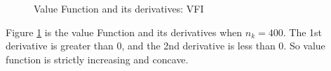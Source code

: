 \documentclass{article}
\begin{document}
	\begin{figure}[H]
		\centering
		\caption{Value Function and its derivatives: VFI}
		\label{fig:vfunc_VFI}
	\end{figure}
	
	Figure \ref{fig:vfunc_VFI} is the value Function and its derivatives when $n_k=400$.
	The 1st derivative is greater than 0, and the 2nd derivative is less than 0.
	So value function is strictly increasing and concave.
	
\end{document}
